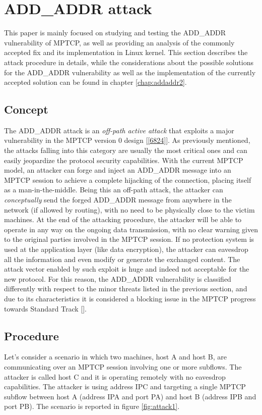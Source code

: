 \section{ADD\_ADDR attack} 
\label{theaddaddrattack}
This paper is mainly focused on studying and testing the ADD\_ADDR vulnerability of MPTCP, as well as providing an analysis of the commonly accepted fix and its implementation in Linux kernel. This section describes the attack procedure in details, while the considerations about the possible solutions for the ADD\_ADDR vulnerability as well as the implementation of the currently accepted solution can be found in chapter \ref{chap:addaddr2}.

\subsection{Concept}
The ADD\_ADDR attack is an \textit{off-path active attack} that exploits a major vulnerability in the MPTCP version 0 design [\ref{6824}]. As previously mentioned, the attacks falling into this category are usually the most critical ones and can easily jeopardize the protocol security capabilities.
With the current MPTCP model, an attacker can forge and inject an ADD\_ADDR message into an MPTCP session to achieve a complete hijacking of the connection, placing itself as a man-in-the-middle. Being this an off-path attack, the attacker can \textit{conceptually} send the forged ADD\_ADDR message from anywhere in the network (if allowed by routing), with no need to be physically close to the victim machines. At the end of the attacking procedure, the attacker will be able to operate in any way on the ongoing data transmission, with no clear warning given to the original parties involved in the MPTCP session.
If no protection system is used at the application layer (like data encryption), the attacker can eavesdrop all the information and even modify or generate the exchanged content. The attack vector enabled by such exploit is huge and indeed not acceptable for the new protocol. For this reason, the ADD\_ADDR vulnerability is classified differently with respect to the minor threats listed in the previous section, and due to its characteristics it is considered a blocking issue in the MPTCP progress towards Standard Track [].

\subsection{Procedure}
Let's consider a scenario in which two machines, host A and host B, are communicating over an MPTCP session involving one or more subflows. The attacker is called host C and it is operating remotely with no eavesdrop capabilities. The attacker is using address IPC and targeting a single MPTCP subflow between host A (address IPA and port PA) and host B (address IPB and port PB). The scenario is reported in figure \ref{fig:attack1}.

